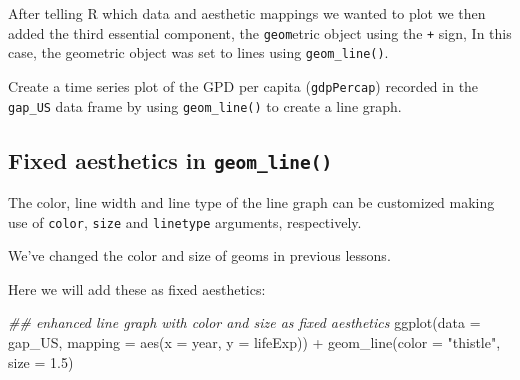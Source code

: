 \documentclass[
  letterpaper,
  DIV=11,
  numbers=noendperiod]{scrreprt}
\newenvironment{Shaded}{\begin{snugshade}}{\end{snugshade}}
\newcommand{\AttributeTok}[1]{\textcolor[rgb]{0.40,0.45,0.13}{#1}}
\newcommand{\DocumentationTok}[1]{\textcolor[rgb]{0.37,0.37,0.37}{\textit{#1}}}
\newcommand{\FloatTok}[1]{\textcolor[rgb]{0.68,0.00,0.00}{#1}}
\newcommand{\FunctionTok}[1]{\textcolor[rgb]{0.28,0.35,0.67}{#1}}
\newcommand{\NormalTok}[1]{\textcolor[rgb]{0.00,0.23,0.31}{#1}}
\newcommand{\SpecialCharTok}[1]{\textcolor[rgb]{0.37,0.37,0.37}{#1}}
\newcommand{\StringTok}[1]{\textcolor[rgb]{0.13,0.47,0.30}{#1}}
\begin{document}
After telling R which data and aesthetic mappings we wanted to plot we
then added the third essential component, the \texttt{geom}etric object
using the \texttt{+} sign, In this case, the geometric object was set to
lines using \texttt{geom\_line()}.

\begin{tcolorbox}[enhanced jigsaw, colframe=quarto-callout-tip-color-frame, colbacktitle=quarto-callout-tip-color!10!white, titlerule=0mm, opacitybacktitle=0.6, breakable, toprule=.15mm, arc=.35mm, rightrule=.15mm, colback=white, bottomrule=.15mm, opacityback=0, toptitle=1mm, left=2mm, bottomtitle=1mm, title=\textcolor{quarto-callout-tip-color}{\faLightbulb}\hspace{0.5em}{Practice}, leftrule=.75mm, coltitle=black]

Create a time series plot of the GPD per capita (\texttt{gdpPercap})
recorded in the \texttt{gap\_US} data frame by using
\texttt{geom\_line()} to create a line graph.

\end{tcolorbox}

\hypertarget{fixed-aesthetics-in-geom_line}{%
\subsection{\texorpdfstring{Fixed aesthetics in
\texttt{geom\_line()}}{Fixed aesthetics in geom\_line()}}\label{fixed-aesthetics-in-geom_line}}

The color, line width and line type of the line graph can be customized
making use of \texttt{color}, \texttt{size} and \texttt{linetype}
arguments, respectively.

We've changed the color and size of geoms in previous lessons.

Here we will add these as fixed aesthetics:

\begin{Shaded}
\begin{Highlighting}[]
\DocumentationTok{\#\# enhanced line graph with color and size as fixed aesthetics}
\FunctionTok{ggplot}\NormalTok{(}\AttributeTok{data =}\NormalTok{ gap\_US, }
       \AttributeTok{mapping =} \FunctionTok{aes}\NormalTok{(}\AttributeTok{x =}\NormalTok{ year, }
                     \AttributeTok{y =}\NormalTok{ lifeExp)) }\SpecialCharTok{+}
  \FunctionTok{geom\_line}\NormalTok{(}\AttributeTok{color =} \StringTok{"thistle"}\NormalTok{,}
            \AttributeTok{size =} \FloatTok{1.5}\NormalTok{) }
\end{Highlighting}
\end{Shaded}
\end{document}
